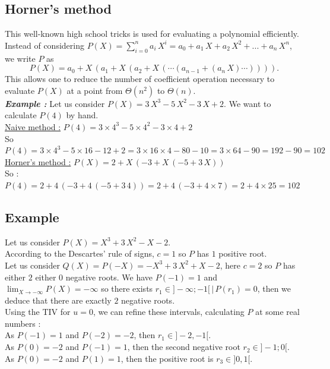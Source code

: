 \subsection{Horner's method}

This well-known high school tricks is used for evaluating a polynomial
efficiently.
Instead of considering $P(X) = \sum_{i=0}^{n} a_i\, X^i = a_0 + a_1\, X + a_2\, X^2 + ... + a_n\, X^n$, we write $P$ as
$$P(X) = a_0 + X\, \left(a_1 + X\, \left(a_2 + X\,\left(\cdots \left(a_{n-1} + \left(a_n\, X\right)\cdots \right)\right)\right)\right).$$
This allows one to reduce the number of coefficient operation
necessary to evaluate $P(X)$ at a point 
from ${\Theta}(n^2)$ to  ${\Theta}(n)$.\\
 


\textit{\textbf{Example :}}
Let us consider $P(X) = 3\, X^3 - 5\,X^2 - 3\,X + 2$. We want to calculate $P(4)$ by hand.\\
\underline{Naive method :} $P(4) = 3\times 4^3 - 5\times 4^2 - 3\times 4 + 2$\\
So $P(4) = 3\times 4^3 - 5\times 16 - 12 + 2 = 3\times 16\times 4 - 80 - 10 = 3\times 64 - 90 = 192 - 90 = 102$\\
\underline{Horner's method :} $P(X) = 2 + X\, \left(-3 + X\, \left(-5 + 3\,X \right) \right)$\\
So :
$ P(4) = 2 + 4\, \left(-3 + 4\, \left(-5 + 3\,4 \right) \right) = 2 + 4\, \left(-3 + 4\times 7 \right) = 2 + 4\times 25 = 102 $\\

\subsection{Example}
Let us consider $P(X) = X^3 + 3\, X^2 - X - 2$.\\
According to the Descartes' rule of signs, $c = 1$ so $P$ has $1$ positive root.\\
Let us consider $Q(X) = P(-X) = -X^3 + 3\, X^2 + X - 2$, here $c = 2$ so $P$ has either $2$ either $0$ negative roots. We have $P(-1) = 1$ and $\lim_{X \to -\infty} P(X) = -\infty$ so there exists $r_{1}\in ]-\infty; -1[\, |\, P(r_1) = 0$, then we deduce that there are exactly $2$ negative roots.\\
Using the TIV for $u = 0$, we can refine these intervals, calculating $P$ at some real numbers : \\
As $P(-1) = 1$ and $P(-2) = -2$, then $r_1\in ]-2, -1[$.\\
As $P(0) = -2$ and $P(-1) = 1$, then the second negative root $r_2\in ]-1;0[$.\\
As $P(0) = -2$ and $P(1) = 1$, then the positive root is $r_3\in ]0, 1[$.


